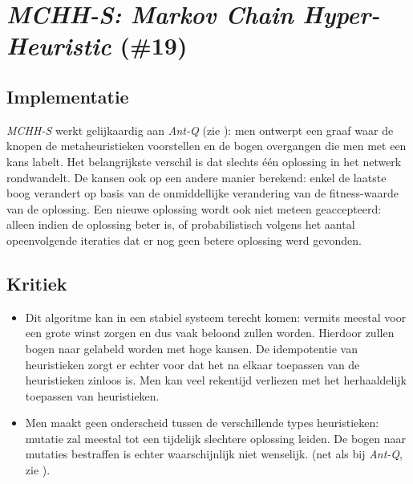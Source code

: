 \section{\emph{MCHH-S: Markov Chain Hyper-Heuristic} (\#19)}

\subsection{Implementatie}
\emph{MCHH-S}\cite{chesc-mchh-s,conf/gecco/McClymontK11} werkt gelijkaardig aan \emph{Ant-Q} (zie ): men ontwerpt een graaf waar de knopen de metaheuristieken voorstellen en de bogen overgangen die men met een kans labelt. Het belangrijkste verschil is dat slechts \'e\'en oplossing in het netwerk rondwandelt. De kansen ook op een andere manier berekend: enkel de laatste boog verandert op basis van de onmiddellijke verandering van de fitness-waarde van de oplossing. Een nieuwe oplossing wordt ook niet meteen geaccepteerd: alleen indien de oplossing beter is, of probabilistisch volgens het aantal opeenvolgende iteraties dat er nog geen betere oplossing werd gevonden.

\subsection{Kritiek}
\begin{itemize}
 \item Dit algoritme kan in een stabiel systeem terecht komen: vermits \abls{} meestal voor een grote winst zorgen en dus vaak beloond zullen worden. Hierdoor zullen bogen naar \abls{} \abhn{} gelabeld worden met hoge kansen. De idempotentie van \abls{} heuristieken zorgt er echter voor dat het na elkaar toepassen van de heuristieken zinloos is. Men kan veel rekentijd verliezen met het herhaaldelijk toepassen van \abls{} heuristieken.
 \item Men maakt geen onderscheid tussen de verschillende types heuristieken: mutatie zal meestal tot een tijdelijk slechtere oplossing leiden. De bogen naar mutaties bestraffen is echter waarschijnlijk niet wenselijk. (net als bij \emph{Ant-Q}, zie ).
\end{itemize}